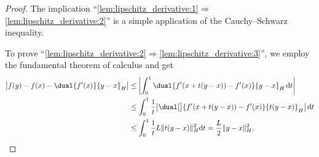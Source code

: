 \documentclass[
	english
]{scrartcl}
\numberwithin{equation}{section} %
\DeclarePairedDelimiter\abs{\lvert}{\rvert}
\DeclarePairedDelimiter\norm{\lVert}{\rVert}
\renewcommand\d{\mathrm{d}}
\begin{document}
\begin{proof}
	The implication ``\ref{lem:lipschitz_derivative:1}$\Rightarrow$\ref{lem:lipschitz_derivative:2}''
	is a simple application of the Cauchy--Schwarz inequality.

	To prove ``\ref{lem:lipschitz_derivative:2}$\Rightarrow$\ref{lem:lipschitz_derivative:3}'',
	we employ the fundamental theorem of calculus
	and get
	\begin{align*}
		\abs[\big]{
			f(y) - f(x) - \dual{f'(x)}{y - x}_H
		}
		&\le
		\abs*{
			\int_0^1 \dual{f'(x + t (y -x)) - f'(x)}{y - x}_H \, \d t
		}
		\\&
		\le
		\int_0^1 \frac1t \abs[\big]{
			\dual[\big]{f'(x + t (y -x)) - f'(x)}{t(y - x)}_H
		} \, \d t
		\\&
		\le
		\int_0^1 \frac1t
		L
		\norm{t(y - x)}_H^2
		\d t
		=
		\frac L2 \norm{y - x}_H^2
		.
	\end{align*}


\end{proof}
\end{document}
